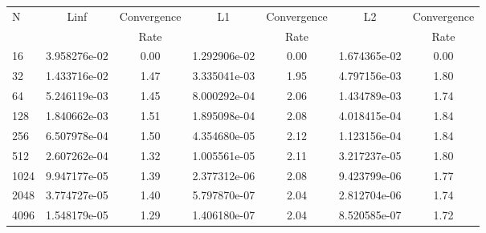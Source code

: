 \documentclass[12pt]{article}
\begin{document}
	\begin{tabular}{l|c|c|c|c|c|c}
		N&Linf&Convergence&L1&Convergence&L2&Convergence\\
		&&Rate&&Rate&&Rate\\
		\hline
		16&3.958276e-02&0.00&1.292906e-02&0.00&1.674365e-02&0.00\\
		\hline
		32&1.433716e-02&1.47&3.335041e-03&1.95&4.797156e-03&1.80\\
		\hline
		64&5.246119e-03&1.45&8.000292e-04&2.06&1.434789e-03&1.74\\
		\hline
		128&1.840662e-03&1.51&1.895098e-04&2.08&4.018415e-04&1.84\\
		\hline
		256&6.507978e-04&1.50&4.354680e-05&2.12&1.123156e-04&1.84\\
		\hline
		512&2.607262e-04&1.32&1.005561e-05&2.11&3.217237e-05&1.80\\
		\hline
		1024&9.947177e-05&1.39&2.377312e-06&2.08&9.423799e-06&1.77\\
		\hline
		2048&3.774727e-05&1.40&5.797870e-07&2.04&2.812704e-06&1.74\\
		\hline
		4096&1.548179e-05&1.29&1.406180e-07&2.04&8.520585e-07&1.72\\
	\end{tabular}
\end{document}
